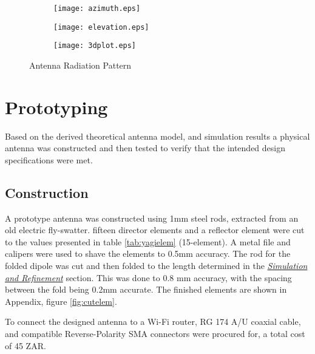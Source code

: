 \documentclass[10pt,twocolumn,hidelinks]{witseiepaper}
\begin{document}
\begin{figure*}
    \centering
    \begin{subfigure}{0.3\linewidth}
        \texttt{[image: azimuth.eps]}
        \vspace{-.2cm}
    \end{subfigure}
    \begin{subfigure}{0.3\linewidth}
        \texttt{[image: elevation.eps]}
        \vspace{-.5cm}
    \end{subfigure}
    \begin{subfigure}{0.3\linewidth}
        \texttt{[image: 3dplot.eps]}

    \end{subfigure}
    \caption{Antenna Radiation Pattern}
    \label{antpatt}
\end{figure*}

\section{Prototyping}
Based on the derived theoretical antenna model, and simulation results a
physical antenna was constructed and then tested to verify that the
intended design specifications were met.

\subsection{Construction}
A prototype antenna was constructed using 1mm steel rods, extracted from an
old electric fly-swatter. fifteen director elements and a reflector element
were cut to the values presented in table \ref{tab:yagielem} (15-element).
A metal file and calipers were used to shave the elements to 0.5mm
accuracy. The rod for the folded dipole was cut and then folded to the
length determined in the \hyperref[simref]{\textit{Simulation and
Refinement}} section. This was done to 0.8 mm accuracy, with the spacing
between the fold being 0.2mm accurate. The finished elements are shown in
Appendix, figure \ref{fig:cutelem}.

To connect the designed antenna to a Wi-Fi router, RG 174 A/U coaxial
cable\cite{rg174}, and compatible Reverse-Polarity SMA connectors were
procured for, a total cost of 45 ZAR.
\end{document}
